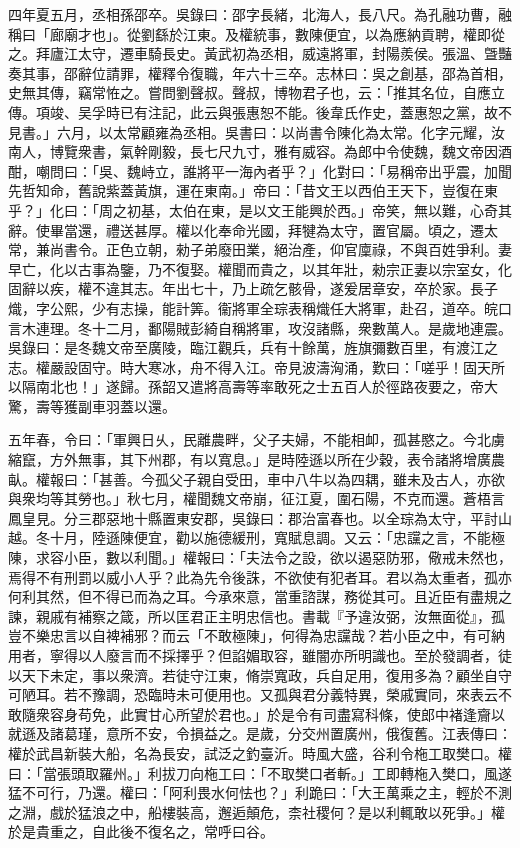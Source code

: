 \begin{pinyinscope}
四年夏五月，丞相孫邵卒。吳錄曰：邵字長緒，北海人，長八尺。為孔融功曹，融稱曰「廊廟才也」。從劉繇於江東。及權統事，數陳便宜，以為應納貢聘，權即從之。拜廬江太守，遷車騎長史。黃武初為丞相，威遠將軍，封陽羨侯。張溫、曁豔奏其事，邵辭位請罪，權釋令復職，年六十三卒。志林曰：吳之創基，邵為首相，史無其傳，竊常恠之。嘗問劉聲叔。聲叔，博物君子也，云：「推其名位，自應立傳。項竣、吴孚時已有注記，此云與張惠恕不能。後韋氏作史，蓋惠恕之黨，故不見書。」六月，以太常顧雍為丞相。吳書曰：以尚書令陳化為太常。化字元耀，汝南人，博覽衆書，氣幹剛毅，長七尺九寸，雅有威容。為郎中令使魏，魏文帝因酒酣，嘲問曰：「吳、魏峙立，誰將平一海內者乎？」化對曰：「易稱帝出乎震，加聞先哲知命，舊說紫蓋黃旗，運在東南。」帝曰：「昔文王以西伯王天下，豈復在東乎？」化曰：「周之初基，太伯在東，是以文王能興於西。」帝笑，無以難，心奇其辭。使畢當還，禮送甚厚。權以化奉命光國，拜犍為太守，置官屬。頃之，遷太常，兼尚書令。正色立朝，勑子弟廢田業，絕治產，仰官廩祿，不與百姓爭利。妻早亡，化以古事為鑒，乃不復娶。權聞而貴之，以其年壯，勑宗正妻以宗室女，化固辭以疾，權不違其志。年出七十，乃上疏乞骸骨，遂爰居章安，卒於家。長子熾，字公熙，少有志操，能計筭。衞將軍全琮表稱熾任大將軍，赴召，道卒。皖口言木連理。冬十二月，鄱陽賊彭綺自稱將軍，攻沒諸縣，衆數萬人。是歲地連震。吳錄曰：是冬魏文帝至廣陵，臨江觀兵，兵有十餘萬，旌旗彌數百里，有渡江之志。權嚴設固守。時大寒冰，舟不得入江。帝見波濤洶涌，歎曰：「嗟乎！固天所以隔南北也！」遂歸。孫韶又遣將高壽等率敢死之士五百人於徑路夜要之，帝大驚，壽等獲副車羽蓋以還。

五年春，令曰：「軍興日乆，民離農畔，父子夫婦，不能相卹，孤甚愍之。今北虜縮竄，方外無事，其下州郡，有以寬息。」是時陸遜以所在少穀，表令諸將增廣農畒。權報曰：「甚善。今孤父子親自受田，車中八牛以為四耦，雖未及古人，亦欲與衆均等其勞也。」秋七月，權聞魏文帝崩，征江夏，圍石陽，不克而還。蒼梧言鳳皇見。分三郡惡地十縣置東安郡，吳錄曰：郡治富春也。以全琮為太守，平討山越。冬十月，陸遜陳便宜，勸以施德緩刑，寬賦息調。又云：「忠讜之言，不能極陳，求容小臣，數以利聞。」權報曰：「夫法令之設，欲以遏惡防邪，儆戒未然也，焉得不有刑罰以威小人乎？此為先令後誅，不欲使有犯者耳。君以為太重者，孤亦何利其然，但不得已而為之耳。今承來意，當重諮謀，務從其可。且近臣有盡規之諫，親戚有補察之箴，所以匡君正主明忠信也。書載『予違汝弼，汝無面從』，孤豈不樂忠言以自裨補邪？而云「不敢極陳」，何得為忠讜哉？若小臣之中，有可納用者，寧得以人廢言而不採擇乎？但諂媚取容，雖闇亦所明識也。至於發調者，徒以天下未定，事以衆濟。若徒守江東，脩崇寬政，兵自足用，復用多為？顧坐自守可陋耳。若不豫調，恐臨時未可便用也。又孤與君分義特異，榮戚實同，來表云不敢隨衆容身苟免，此實甘心所望於君也。」於是令有司盡寫科條，使郎中褚逢齎以就遜及諸葛瑾，意所不安，令損益之。是歲，分交州置廣州，俄復舊。江表傳曰：權於武昌新裝大船，名為長安，試泛之釣臺沂。時風大盛，谷利令柂工取樊口。權曰：「當張頭取羅州。」利拔刀向柂工曰：「不取樊口者斬。」工即轉柂入樊口，風遂猛不可行，乃還。權曰：「阿利畏水何怯也？」利跪曰：「大王萬乘之主，輕於不測之淵，戲於猛浪之中，船樓裝高，邂逅顛危，柰社稷何？是以利輒敢以死爭。」權於是貴重之，自此後不復名之，常呼曰谷。


\end{pinyinscope}
